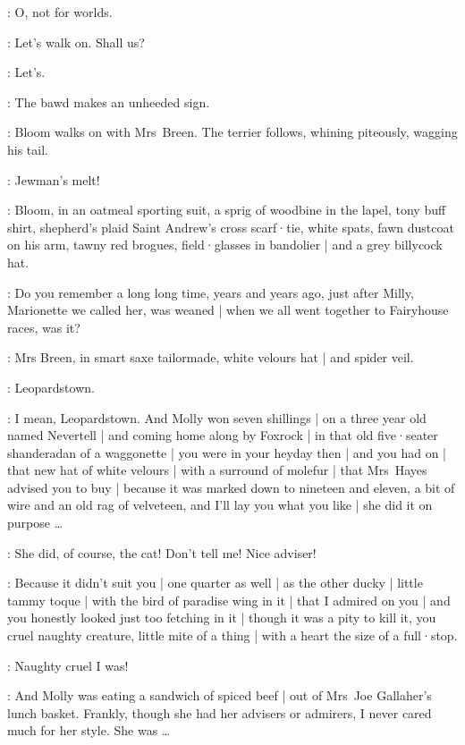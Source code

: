\MrsBreen:
O,
not for worlds.

\Bloom:
Let's walk on.
Shall us?

\MrsBreen:
Let's.

:
The bawd makes an unheeded sign.

:
Bloom walks on with Mrs~Breen.
The terrier follows,
whining piteously,
wagging his tail.

\Bawd[1]:
Jewman's melt!

:
Bloom,
in an oatmeal sporting suit,
a sprig of woodbine in the lapel,
tony buff shirt,
shepherd's plaid Saint Andrew's cross scarf·tie,
white spats,
fawn dustcoat on his arm,
tawny red brogues,
field·glasses in bandolier |
and a grey billycock hat.

\Bloom:
Do you remember a long long time,
years and years ago,
just after Milly,
Marionette we called her,
was weaned |
when we all went together to Fairyhouse races,
was it?

:
Mrs Breen,
in smart saxe tailormade,
white velours hat |
and spider veil.

\MrsBreen:
Leopardstown.

\Bloom:
I mean,
Leopardstown.
And Molly won seven shillings |
on a three year old named Nevertell |
and coming home along by Foxrock |
in that old five·seater shanderadan of a waggonette |
you were in your heyday then  |
and you had on |
that new hat of white velours |
with a surround of molefur |
that Mrs~Hayes
advised you to buy |
because it was marked down to nineteen and eleven,
a bit of wire and an old rag of velveteen,
and I'll lay you what you like |
she did it on purpose \ldots

\MrsBreen:
She did,
of course,
the cat!
Don't tell me!
Nice adviser!

\Bloom:
Because it didn't suit you |
one quarter as well |
as the other ducky |
little tammy toque |
with the bird of paradise wing in it |
that I admired on you |
and you honestly looked just too fetching in it |
though it was a pity to kill it,
you cruel naughty creature,
little mite of a thing |
with a heart the size of a full·stop.%

\MrsBreen:
Naughty cruel I was!

\Bloom:
And Molly was eating a sandwich of spiced beef |
out of Mrs~Joe Gallaher's lunch basket.
Frankly,
though she had her advisers or admirers,
I never cared much for her style.
She was \ldots

